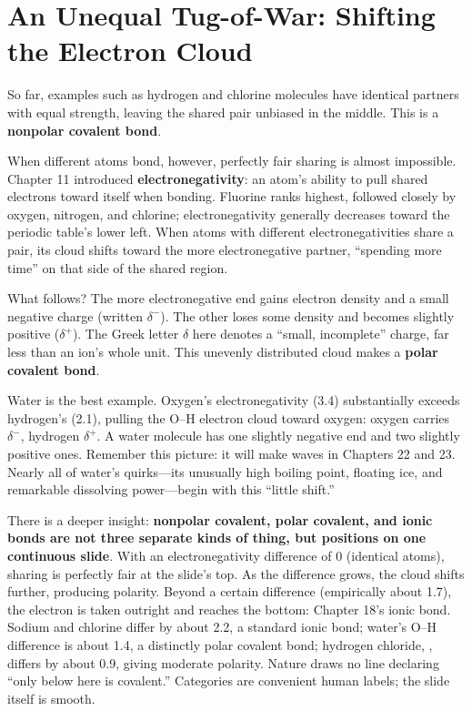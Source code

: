 \section{An Unequal Tug-of-War: Shifting the Electron Cloud}

So far, examples such as hydrogen and chlorine molecules have identical partners with equal strength, leaving the shared pair unbiased in the middle. This is a \textbf{nonpolar covalent bond}.

When different atoms bond, however, perfectly fair sharing is almost impossible. Chapter 11 introduced \textbf{electronegativity}: an atom's ability to pull shared electrons toward itself when bonding. Fluorine ranks highest, followed closely by oxygen, nitrogen, and chlorine; electronegativity generally decreases toward the periodic table's lower left. When atoms with different electronegativities share a pair, its cloud shifts toward the more electronegative partner, ``spending more time'' on that side of the shared region.

What follows? The more electronegative end gains electron density and a small negative charge (written $\delta^{-}$). The other loses some density and becomes slightly positive ($\delta^{+}$). The Greek letter $\delta$ here denotes a ``small, incomplete'' charge, far less than an ion's whole unit. This unevenly distributed cloud makes a \textbf{polar covalent bond}.

Water is the best example. Oxygen's electronegativity (3.4) substantially exceeds hydrogen's (2.1), pulling the O--H electron cloud toward oxygen: oxygen carries $\delta^{-}$, hydrogen $\delta^{+}$. A water molecule has one slightly negative end and two slightly positive ones. Remember this picture: it will make waves in Chapters 22 and 23. Nearly all of water's quirks---its unusually high boiling point, floating ice, and remarkable dissolving power---begin with this ``little shift.''

There is a deeper insight: \textbf{nonpolar covalent, polar covalent, and ionic bonds are not three separate kinds of thing, but positions on one continuous slide}. With an electronegativity difference of 0 (identical atoms), sharing is perfectly fair at the slide's top. As the difference grows, the cloud shifts further, producing polarity. Beyond a certain difference (empirically about 1.7), the electron is taken outright and reaches the bottom: Chapter 18's ionic bond. Sodium and chlorine differ by about 2.2, a standard ionic bond; water's O--H difference is about 1.4, a distinctly polar covalent bond; hydrogen chloride, , differs by about 0.9, giving moderate polarity. Nature draws no line declaring ``only below here is covalent.'' Categories are convenient human labels; the slide itself is smooth.

